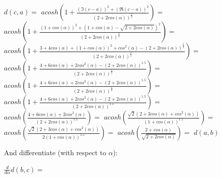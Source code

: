 \documentclass[a4paper,10pt]{article}
\begin{document}
$ d\left(c, a\right)=$
$acosh\left(1 + \frac{\left(\Im\left(c - a\right)\right)^{2} + \left(\Re\left(c - a\right)\right)^{2}}{\left(2 + 2 cos\left(\alpha\right)\right)^{\frac{3}{2}}}\right) =$
$acosh\left(1 + \frac{\left(1 + cos\left(\alpha\right)\right)^{2} + \left(1 + cos\left(\alpha\right) - \sqrt{2 + 2 cos\left(\alpha\right)}\right)^{2}}{\left(2 + 2 cos\left(\alpha\right)\right)^{\frac{3}{2}}}\right) =$
$acosh\left(1 + \frac{3 + 4 cos\left(\alpha\right) + \left(1 + cos\left(\alpha\right)\right)^{2} + cos^{2}\left(\alpha\right) - \left(2 + 2 cos\left(\alpha\right)\right)^{\frac{3}{2}}}{\left(2 + 2 cos\left(\alpha\right)\right)^{\frac{3}{2}}}\right) =$
$acosh\left(1 + \frac{4 + 6 cos\left(\alpha\right) + 2 cos^{2}\left(\alpha\right) - \left(2 + 2 cos\left(\alpha\right)\right)^{1.5}}{\left(2 + 2 cos\left(\alpha\right)\right)^{\frac{3}{2}}}\right) =$
$acosh\left(1 + \frac{4 + 6 cos\left(\alpha\right) + 2 cos^{2}\left(\alpha\right) - \left(2 + 2 cos\left(\alpha\right)\right)^{1.5}}{\left(2 + 2 cos\left(\alpha\right)\right)^{\frac{3}{2}}}\right) =$
$acosh\left(1 + \frac{4 + 6 cos\left(\alpha\right) + 2 cos^{2}\left(\alpha\right) - \left(2 + 2 cos\left(\alpha\right)\right)^{1.5}}{\left(2 + 2 cos\left(\alpha\right)\right)^{1.5}}\right) =$
$acosh\left(\frac{4 + 6 cos\left(\alpha\right) + 2 cos^{2}\left(\alpha\right)}{\left(2 + 2 cos\left(\alpha\right)\right)^{1.5}}\right) =$
$acosh\left(\frac{\sqrt{2} \left(2 + 3 cos\left(\alpha\right) + cos^{2}\left(\alpha\right)\right)}{\left(1 + cos\left(\alpha\right)\right)^{1.5}}\right) =$
$acosh\left(\frac{\sqrt{2} \left(2 + 3 cos\left(\alpha\right) + cos^{2}\left(\alpha\right)\right)}{2 \left(1 + cos\left(\alpha\right)\right)^{1.5}}\right) =$
$acosh\left(\frac{2 + cos\left(\alpha\right)}{\sqrt{2 + 2 cos\left(\alpha\right)}}\right) =$
$ d\left(a, b\right) $


And differentiate (with respect to $\alpha$):


$\frac{d}{d\alpha}d\left(b,c\right)=$
\end{document}
